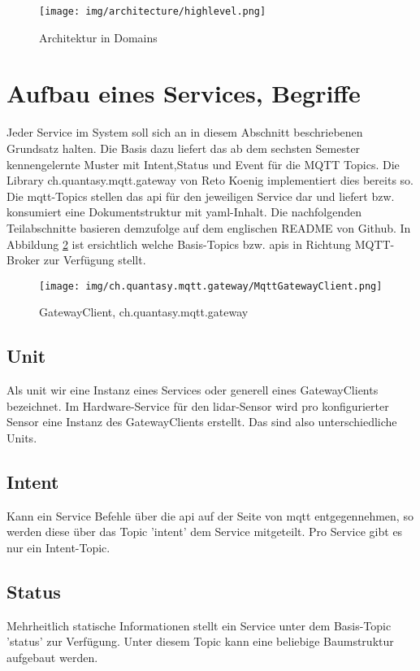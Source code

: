 \begin{figure}[H]
	\centering
	\texttt{[image: img/architecture/highlevel.png]}
	\caption{Architektur in Domains}
	\label{fig:architecture_highlevel}
\end{figure}


\section{Aufbau eines Services, Begriffe}
Jeder Service im System soll sich an in diesem Abschnitt beschriebenen Grundsatz halten. Die Basis dazu liefert das ab dem sechsten Semester kennengelernte Muster mit Intent,Status und Event für die MQTT Topics. Die Library ch.quantasy.mqtt.gateway\cite{ch.quantasy.mqtt.gateway} von Reto Koenig implementiert dies bereits so. Die \acrshort{mqtt}-Topics stellen das \acrshort{api} für den jeweiligen Service dar und liefert bzw. konsumiert eine Dokumentstruktur mit \acrshort{yaml}-Inhalt. Die nachfolgenden Teilabschnitte basieren demzufolge auf dem englischen README von Github\cite{ch.quantasy.mqtt.gateway}. In Abbildung \ref{fig:gatewayclient} ist ersichtlich welche Basis-Topics bzw. \acrshort{api}s in Richtung MQTT-Broker zur Verfügung stellt.

\begin{figure}[H]
	\centering
	\texttt{[image: img/ch.quantasy.mqtt.gateway/MqttGatewayClient.png]}
    \caption{GatewayClient, ch.quantasy.mqtt.gateway\cite{ch.quantasy.mqtt.gateway}}
    \label{fig:gatewayclient}
\end{figure}



\subsection{Unit}
Als \gls{unit} wir eine Instanz eines Services oder generell eines GatewayClients bezeichnet. Im Hardware-Service für den \acrshort{lidar}-Sensor wird pro konfigurierter Sensor eine Instanz des GatewayClients erstellt. Das sind also unterschiedliche Units.
\subsection{Intent}
Kann ein Service Befehle über die \acrshort{api} auf der Seite von \acrshort{mqtt} entgegennehmen, so werden diese über das Topic '\gls{intent}' dem Service mitgeteilt. Pro Service gibt es nur ein Intent-Topic.
\subsection{Status}
Mehrheitlich statische Informationen stellt ein Service unter dem Basis-Topic '\gls{status}' zur Verfügung. Unter diesem Topic kann eine beliebige Baumstruktur aufgebaut werden.
